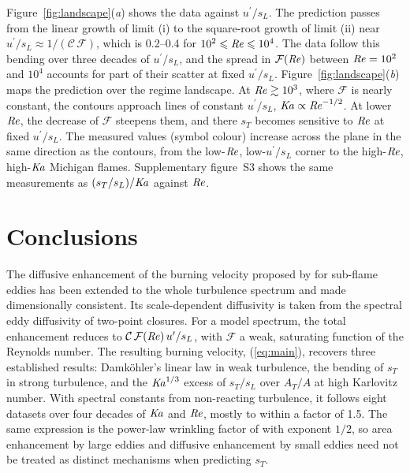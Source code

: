 \documentclass[lineno]{jfm}
\providecommand{\Rey}{\mbox{\textit{Re}}}
\providecommand{\Ka}{\mbox{\textit{Ka}}}
\newcommand{\sL}{s_L}
\newcommand{\Cs}{\mathcal{C}}
\newcommand{\up}{u^{\prime}}
\begin{document}
Figure~\ref{fig:landscape}(\textit{a}) shows the data against $\up / \sL$. The prediction passes from the linear growth of limit (i) to the square-root growth of limit (ii) near $\up / \sL \approx 1 / (\Cs \, \mathcal{F})$, which is 0.2--0.4 for $10^2 \leqslant \Rey \leqslant 10^4$. The data follow this bending over three decades of $\up / \sL$, and the spread in $\mathcal{F}(\Rey)$ between $\Rey = 10^2$ and $10^4$ accounts for part of their scatter at fixed $\up / \sL$. Figure~\ref{fig:landscape}(\textit{b}) maps the prediction over the regime landscape. At $\Rey \gtrsim 10^3$, where $\mathcal{F}$ is nearly constant, the contours approach lines of constant $\up / \sL$, $\Ka \propto \Rey^{-1/2}$. At lower $\Rey$, the decrease of $\mathcal{F}$ steepens them, and there $s_T$ becomes sensitive to $\Rey$ at fixed $\up / \sL$. The measured values (symbol colour) increase across the plane in the same direction as the contours, from the low-$\Rey$, low-$\up / \sL$ corner to the high-$\Rey$, high-$\Ka$ Michigan flames. Supplementary figure~S3 shows the same measurements as $(s_T / \sL) / \Ka$ against $\Rey$.

\section{Conclusions}\label{sec:conclusions}

The diffusive enhancement of the burning velocity proposed by \citet{Nivarti2019} for sub-flame eddies has been extended to the whole turbulence spectrum and made dimensionally consistent. Its scale-dependent diffusivity is taken from the spectral eddy diffusivity of two-point closures. For a model spectrum, the total enhancement reduces to $\Cs \, \mathcal{F}(\Rey) \, \up / \sL$, with $\mathcal{F}$ a weak, saturating function of the Reynolds number. The resulting burning velocity, (\ref{eq:main}), recovers three established results: Damk\"ohler's linear law in weak turbulence, the bending of $s_T$ in strong turbulence, and the $\Ka^{1/3}$ excess of $s_T / \sL$ over $A_T / A$ at high Karlovitz number. With spectral constants from non-reacting turbulence, it follows eight datasets over four decades of $\Ka$ and $\Rey$, mostly to within a factor of 1.5. The same expression is the power-law wrinkling factor of \citet{Charlette2002a} with exponent $1/2$, so area enhancement by large eddies and diffusive enhancement by small eddies need not be treated as distinct mechanisms when predicting $s_T$.
\end{document}
